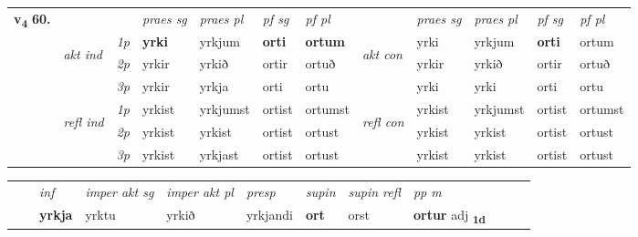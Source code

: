 \begin{tabular}{llllllllllll} \toprule
\multirow{4}{*}{{{\textbf{v{\textsubscript{4}}} \Large{\textbf{60.}}}}}  & &   &  \textit{praes sg}  & \textit{praes pl}  &\textit{ pf sg} & \textit{pf pl} &  &  \textit{praes sg}  & \textit{praes pl}  & \textit{pf sg} & \textit{pf pl } \\*
	\cmidrule{4-7} \cmidrule{9-12}
 & \multirow{3}{*}{\begin{turn}{90}\textit{akt ind}\end{turn}} & {\textit{1p}} & \textbf{yrki} & yrkjum    & \textbf{orti} & \textbf{ortum} & \multirow{3}{*}{\begin{turn}{90}\textit{akt con}\end{turn}} &yrki & yrkjum & \textbf{orti} & ortum\\*
& &  {\textit{2p}} &  yrkir  & yrkið   & ortir & ortuð & & yrkir & yrkið & ortir & ortuð \\*
& &  {\textit{3p}} & yrkir & yrkja   & orti & ortu & & yrki & yrki& orti & ortu  \\*
\cmidrule{4-7} \cmidrule{9-12}
 &\multirow{3}{*}{\begin{turn}{90}\textit{refl ind}\end{turn}} & {\textit{1p}} & yrkist & yrkjumst    & ortist & ortumst & \multirow{3}{*}{\begin{turn}{90}\textit{refl con}\end{turn}}  &yrkist & yrkjumst & ortist & ortumst\\*
 &&  {\textit{2p}} &  yrkist  & yrkist   & ortist & ortust & &yrkist & yrkist & ortist & ortust \\*
& &  {\textit{3p}} & yrkist & yrkjast   & ortist & ortust & & yrkist & yrkist& ortist & ortust  \\*
\cmidrule{4-7} \cmidrule{9-12}
\end{tabular}


\begin{tabular}{llllllllllll}
 & & \textit{inf} & \textit{imper akt sg} & \textit{imper akt pl}   & \textit{presp} & \textit{supin} & \textit{supin refl} & \textit{pp m}     \\*
  & & \textbf{yrkja} & yrktu  & yrkið   & yrkjandi &  \textbf{ort} & orst & \textbf{ortur} adj \textbf{\textsubscript{1d}} \\*
\cmidrule{1-12}
\end{tabular}



